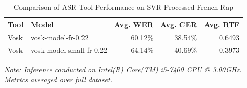\begin{table}[h!]
\centering
\caption{Comparison of ASR Tool Performance on SVR-Processed French Rap}
\label{table:asr_results}
\begin{tabular}{l l r r r}
\hline
\textbf{Tool} & \textbf{Model} & \textbf{Avg. WER} & \textbf{Avg. CER} & \textbf{Avg. RTF} \\
\hline
Vosk & vosk-model-fr-0.22 & 60.12\% & 38.54\% & 0.6493 \\
Vosk & vosk-model-small-fr-0.22 & 64.14\% & 40.69\% & 0.3973 \\
\hline
\end{tabular}
\par\smallskip
\small \textit{Note: Inference conducted on Intel(R) Core(TM) i5-7400 CPU @ 3.00GHz. Metrics averaged over full dataset.}
\end{table}